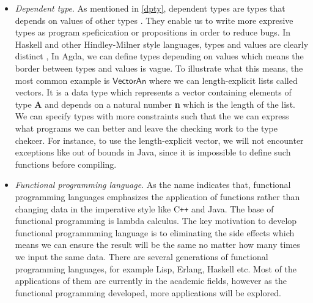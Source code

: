 \begin{itemize}
\item \textit{Dependent type}. 
As mentioned in \ref{dpty}, dependent types are types that depends on values of other types \cite{dtw}. They enable us to write more expresive types as program speficication or propositions in order to reduce bugs. In Haskell and other Hindley-Milner style languages, types and values are clearly distinct \cite{tutorial}, In Agda, we can define types depending on values which means the border between types and values is vague. To illustrate what this means, the most common example is $\mathsf{Vector A n}$ where we can length-explicit lists called vectors. It is a data type which represents a vector containing elements of type \textbf{A} and depends on a natural number \textbf{n} which is the length of the list. We can specify types with more constraints such that the we can express what programs we can better and leave the checking work to the type chekcer. For instance, to use the length-explicit vector, we will not encounter exceptions like out of bounds in Java, since it is impossible to define such functions before compiling.

\item \textit{Functional programming language}. As the name indicates that, functional programming languages emphasizes the application of functions rather than changing data in the imperative style like C{}\verb!++! and Java. The base of functional programming is lambda calculus. The key motivation to develop functional programmming language is to eliminating the side effects which means we can ensure the result will be the same no matter how many times we input the same data. There are several generations of functional programming languages, for example Lisp, Erlang, Haskell etc. Most of the applications of them are currently in the academic fields, however as the functional programming developed, more applications will be explored.



\end{itemize}
